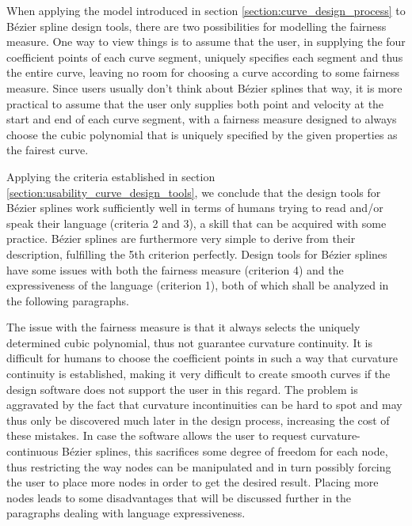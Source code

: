 \documentclass[a4paper]{article}
\begin{document}
				When applying the model introduced in section \ref{section:curve_design_process} to Bézier spline design tools, there are two possibilities for modelling the fairness measure. One way to view things is to assume that the user, in supplying the four coefficient points of each curve segment, uniquely specifies each segment and thus the entire curve, leaving no room for choosing a curve according to some fairness measure. Since users usually don't think about Bézier splines that way, it is more practical to assume that the user only supplies both point and velocity at the start and end of each curve segment, with a fairness measure designed to always choose the cubic polynomial that is uniquely specified by the given properties as the fairest curve.

				Applying the criteria established in section \ref{section:usability_curve_design_tools}, we conclude that the design tools for Bézier splines work sufficiently well in terms of humans trying to read and/or speak their language (criteria 2 and 3), a skill that can be acquired with some practice. Bézier splines are furthermore very simple to derive from their description, fulfilling the 5th criterion perfectly. Design tools for Bézier splines have some issues with both the fairness measure (criterion 4) and the expressiveness of the language (criterion 1), both of which shall be analyzed in the following paragraphs.

				The issue with the fairness measure is that it always selects the uniquely determined cubic polynomial, thus not guarantee curvature continuity. It is difficult for humans to choose the coefficient points in such a way that curvature continuity is established, making it very difficult to create smooth curves if the design software does not support the user in this regard. The problem is aggravated by the fact that curvature incontinuities can be hard to spot and may thus only be discovered much later in the design process, increasing the cost of these mistakes. In case the software allows the user to request curvature-continuous Bézier splines, this sacrifices some degree of freedom for each node, thus restricting the way nodes can be manipulated and in turn possibly forcing the user to place more nodes in order to get the desired result. Placing more nodes leads to some disadvantages that will be discussed further in the paragraphs dealing with language expressiveness.
\end{document}
